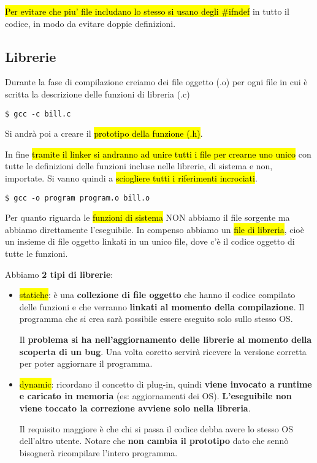 \hl{Per evitare che piu' file includano lo stesso si usano degli \#ifndef} in tutto il codice, in modo da evitare doppie definizioni.


\subsection{Librerie}

Durante la fase di compilazione creiamo dei file oggetto (.o) per ogni file in cui è scritta la descrizione delle funzioni di libreria (.c)

\begin{lstlisting}
$ gcc -c bill.c
\end{lstlisting}

Si andrà poi a creare il \hl{prototipo della funzione (.h)}.

In fine \hl{tramite il linker si andranno ad unire tutti i file per crearne uno unico} con tutte le definizioni delle funzioni incluse nelle librerie, di sistema e non, importate. Si vanno quindi a \hl{sciogliere tutti i riferimenti incrociati}.

\begin{lstlisting}
$ gcc -o program program.o bill.o
\end{lstlisting}

Per quanto riguarda le \hl{funzioni di sistema} NON abbiamo il file sorgente ma abbiamo direttamente l'eseguibile. In compenso abbiamo un \hl{file di libreria}, cioè un insieme di file oggetto linkati in un unico file, dove c'è il codice oggetto di tutte le funzioni.

Abbiamo \textbf{2 tipi di librerie}:
\begin{itemize}
	\item \hl{statiche}: è una \textbf{collezione di file oggetto} che hanno il codice compilato delle funzioni e che verranno \textbf{linkati al momento della compilazione}. Il programma che si crea sarà possibile essere eseguito solo sullo stesso OS.
		
		Il \textbf{problema si ha nell'aggiornamento delle librerie al momento della scoperta di un bug}. Una volta coretto servirà ricevere la versione corretta per poter aggiornare il programma.
		
	\item \hl{dynamic}: ricordano il concetto di plug-in, quindi \textbf{viene invocato a runtime e caricato in memoria} (es: aggiornamenti dei OS). \textbf{L'eseguibile non viene toccato la correzione avviene solo nella libreria}.
	
		Il requisito maggiore è che chi si passa il codice debba avere lo stesso OS dell'altro utente. Notare che \textbf{non cambia il prototipo} dato che sennò bisognerà ricompilare l'intero programma.
\end{itemize}


